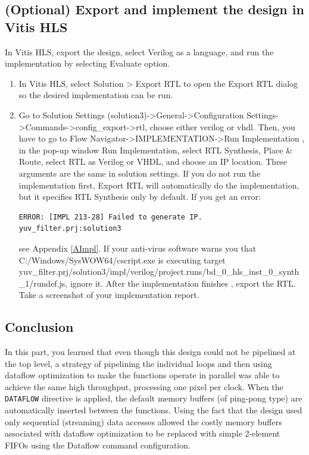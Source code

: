 \documentclass[a4paper,12pt,twoside]{article}
\begin{document}
\subsection{(Optional) Export and implement the design in Vitis HLS}\label{S26}
In Vitis HLS, export the design, select Verilog as a language, and run the implementation by selecting Evaluate option.
\begin{enumerate}
    \item In Vitis HLS, select Solution > Export RTL to open the Export RTL dialog so the desired implementation can be run.
    \item Go to Solution Settings (solution3)->General->Configuration Settings->Commands->config\_export->rtl, choose either verilog or vhdl. Then, you have to go to Flow Navigator->IMPLEMENTATION->Run Implementation \cite{exportrtl}, in the pop-up window Run Implementation, select RTL Synthesis, Place \& Route, select RTL as Verilog or VHDL, and choose an IP location. These arguments are the same in solution settings. If you do not run the implementation first, Export RTL will automatically do the implementation, but it specifies RTL Synthesis only by default. If you get an error:
    \begin{verbatim}
ERROR: [IMPL 213-28] Failed to generate IP.  yuv_filter.prj:solution3
    \end{verbatim}
    see Appendix \ref{AImpl}. If your anti-virus software warns you that\\
    C:/Windows/SysWOW64/cscript.exe is executing target\\
    yuv\_filter.prj/solution3/impl/verilog/project.runs/bd\_0\_hls\_inst\_0\_synth\_1/rundef.js, ignore it. After the implementation finishes \cite{tclstack}, export the RTL. Take a screenshot of your implementation report.
\end{enumerate}
\subsection{Conclusion}
In this part, you learned that even though this design could not be pipelined at the top level, a strategy of pipelining the individual loops and then using dataflow optimization to make the functions operate in parallel was able to achieve the same high throughput, processing one pixel per clock. When the \texttt{DATAFLOW} directive is applied, the default memory buffers (of ping-pong type) are automatically inserted between the functions. Using the fact that the design used only sequential (streaming) data accesses allowed the costly memory buffers associated with dataflow optimization to be replaced with simple 2-element FIFOs using the Dataflow command configuration.
\end{document}
